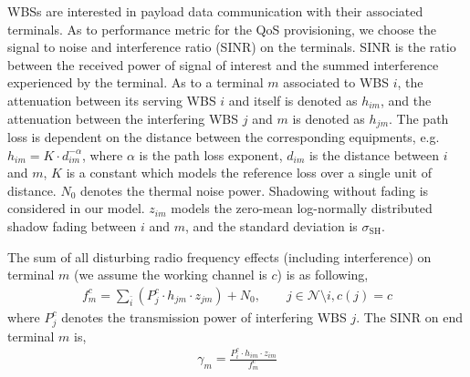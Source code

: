 \documentclass[times]{ettauth}
\theoremstyle{mytheoremstyle}
\theoremstyle{mytheoremstyle}
\theoremstyle{mytheoremstyle}
\begin{document}
WBSs are interested in payload data communication with their associated terminals. 
As to performance metric for the QoS provisioning, we choose the signal to noise and interference ratio (SINR) on the terminals.
SINR is the ratio between the received power of signal of interest and the summed interference experienced by the terminal. 
%
As to a terminal $m$ associated to WBS $i$, the attenuation between its serving WBS $i$ and itself is denoted as $h_{im}$, and the attenuation between the interfering WBS $j$ and $m$ is denoted as $h_{jm}$.
The path loss is dependent on the distance between the corresponding equipments, e.g. $h_{im}=K \cdot d_{im}^{-\alpha}$, where $\alpha$ is the path loss exponent, $d_{im}$ is the distance between $i$ and $m$, $K$ is a constant which models the reference loss over a single unit of distance.  
$N_0$ denotes the thermal noise power.
Shadowing without fading is considered in our model.
$z_{im}$ models the zero-mean log-normally distributed shadow fading between $i$ and $m$, and the standard deviation is $\sigma_{\text{SH}}$.

The sum of all disturbing radio frequency effects (including interference) on terminal $m$ (we assume the working channel is $c$) is as following,
\begin{equation}
\label{interference}
\begin{aligned}
f_m^c=\sum_{\bar{i}} (P_{j}^c \cdot h_{jm} \cdot z_{jm}) +  N_0, \quad \quad j\in \mathcal{N}\setminus i, c(j) = c
\end{aligned}
\end{equation}
where $P_{j}^c$ denotes the transmission power of interfering WBS $j$.
The SINR on end terminal $m$ is,
\begin{equation}
\label{SINR}
\begin{aligned}
\gamma_{m} = \frac{P_{i}^c \cdot h_{im}\cdot z_{im}} {f_m^c}
\end{aligned}
\end{equation}
\end{document}
